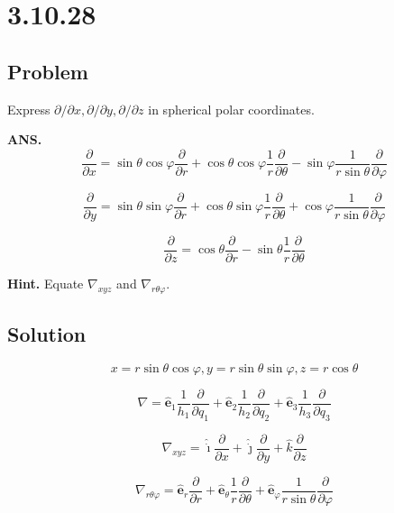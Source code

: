 \documentclass[12pt]{article}
\begin{document}
\section{3.10.28}\label{3.10.28}

\subsection{Problem}

Express \(\partial/\partial x, \partial/\partial y, \partial/\partial z\) in spherical polar coordinates.

\bigskip

\textbf{ANS.}
\[
    \frac{\partial}{\partial x} = \sin{\theta} \cos{\varphi} \frac{\partial}{\partial r}
    + \cos{\theta} \cos{\varphi} \frac{1}{r} \frac{\partial}{\partial \theta}
    - \sin{\varphi} \frac{1}{r \sin{\theta}} \frac{\partial}{\partial \varphi}
\]

\[
    \frac{\partial}{\partial y} = \sin{\theta} \sin{\varphi} \frac{\partial}{\partial r}
    + \cos{\theta} \sin{\varphi} \frac{1}{r} \frac{\partial}{\partial \theta}
    + \cos{\varphi} \frac{1}{r \sin{\theta}} \frac{\partial}{\partial \varphi}
\]

\[
    \frac{\partial}{\partial z} = \cos{\theta} \frac{\partial}{\partial r}
    - \sin{\theta} \frac{1}{r} \frac{\partial}{\partial \theta}
\]

\bigskip

\textbf{Hint.} Equate \(\nabla_{xyz}\) and \(\nabla_{r \theta \varphi }\).

\subsection{Solution}

\[
    x = r \sin{\theta} \cos{\varphi}, y = r \sin{\theta} \sin{\varphi}, z = r \cos{\theta}
\]

\[
    \nabla = \hat{\textbf{e}}_1 \frac{1}{h_1} \frac{\partial}{\partial q_1}
    + \hat{\textbf{e}}_2 \frac{1}{h_2} \frac{\partial}{\partial q_2}
    + \hat{\textbf{e}}_3 \frac{1}{h_3} \frac{\partial}{\partial q_3}
\]

\[
    \nabla_{xyz} =  \hat{\dot{\imath}} \frac{\partial}{\partial x}
    + \hat{\dot{\jmath}} \frac{\partial}{\partial y}
    +  \hat{k} \frac{\partial}{\partial z}
\]

\[
    \nabla_{r \theta \varphi } = \hat{\textbf{e}}_r \frac{\partial}{\partial r}
    + \hat{\textbf{e}}_\theta \frac{1}{r} \frac{\partial}{\partial \theta}
    + \hat{\textbf{e}}_\varphi \frac{1}{r \sin{\theta}} \frac{\partial}{\partial \varphi}
\]
\end{document}
